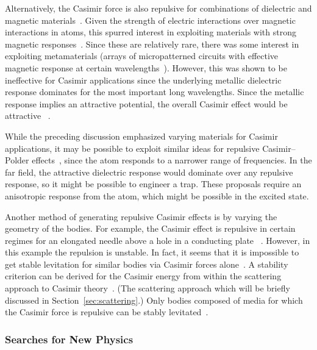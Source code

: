 Alternatively, the Casimir force is also repulsive for combinations of dielectric and magnetic materials~\citep{Boyer1974}.  
Given the strength of electric interactions over magnetic interactions in atoms, this spurred interest
in exploiting materials with strong magnetic responses~\citep{Kenneth2002}.  
Since these are relatively rare, there was some interest in exploiting metamaterials (arrays of micropatterned circuits with
effective magnetic response at certain wavelengths~\citep{Pendry1999}).  However, this was shown to be ineffective
for Casimir applications since the underlying metallic dielectric response dominates for the most important long wavelengths.
Since the metallic response implies an attractive potential, the overall Casimir effect would be attractive~
\citep{Ianuzzi2003comment,Rosa2008,Pirozhenko2008,Yannopapas2009}.  

While the preceding discussion emphasized varying materials for Casimir applications, it may 
be possible to exploit similar ideas for repulsive Casimir--Polder effects~\citep{Milton2011,Milton2012},
since the atom responds to a narrower range of frequencies.  In the far field, the attractive dielectric
response would dominate over any repulsive response, so it might be possible to engineer a trap.  
These proposals require an anisotropic response from the atom, which might be possible in the excited state.

Another method of generating repulsive Casimir effects is by varying the geometry of the bodies.  
For example, the Casimir effect is repulsive in certain regimes for an elongated needle above a hole in a conducting plate~
\citep{Levin2010,Rodriguez2013}.  However, in this example the repulsion is unstable. 
In fact, it seems that it is impossible to get stable levitation for similar bodies via Casimir forces alone~\citep{Rahi2010}.
A stability criterion can be derived for the Casimir energy from within the scattering approach to Casimir theory~\citep{Rahi2010,Rahi2011}.
(The scattering approach which will be briefly discussed in Section~\ref{sec:scattering}.)  Only bodies
composed of media for which the Casimir force is repulsive can be stably levitated~\citep{Rahi2011}.

\subsubsection{Searches for New Physics}

